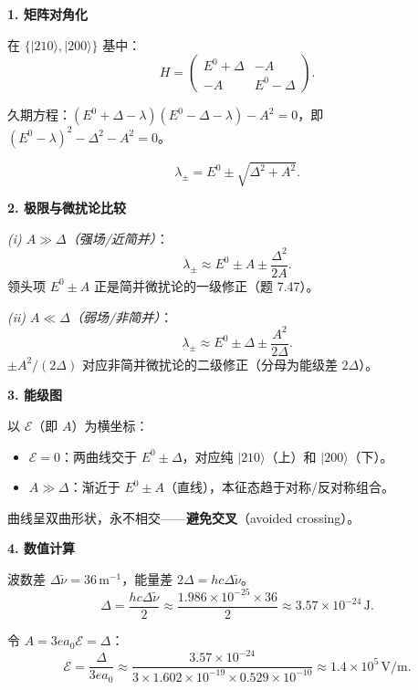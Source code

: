 \begin{derivationbox}[标准解题过程]
\textbf{1. 矩阵对角化}

在 $\{|210\rangle,|200\rangle\}$ 基中：
\[
H=\begin{pmatrix}E^0+\Delta&-A\\-A&E^0-\Delta\end{pmatrix}.
\]

久期方程：$(E^0+\Delta-\lambda)(E^0-\Delta-\lambda)-A^2=0$，即 $(E^0-\lambda)^2-\Delta^2-A^2=0$。

\begin{equation}
\boxed{\lambda_\pm=E^0\pm\sqrt{\Delta^2+A^2}.}
\end{equation}

\textbf{2. 极限与微扰论比较}

\textit{(i) $A\gg\Delta$（强场/近简并）}：
\[
\lambda_\pm\approx E^0\pm A\pm\frac{\Delta^2}{2A}.
\]
领头项 $E^0\pm A$ 正是简并微扰论的一级修正（题 7.47）。

\textit{(ii) $A\ll\Delta$（弱场/非简并）}：
\[
\lambda_\pm\approx E^0\pm\Delta\pm\frac{A^2}{2\Delta}.
\]
$\pm A^2/(2\Delta)$ 对应非简并微扰论的二级修正（分母为能级差 $2\Delta$）。

\textbf{3. 能级图}

以 $\mathcal{E}$（即 $A$）为横坐标：
\begin{itemize}
    \item $\mathcal{E}=0$：两曲线交于 $E^0\pm\Delta$，对应纯 $|210\rangle$（上）和 $|200\rangle$（下）。
    \item $A\gg\Delta$：渐近于 $E^0\pm A$（直线），本征态趋于对称/反对称组合。
\end{itemize}
曲线呈双曲形状，永不相交——\textbf{避免交叉}（avoided crossing）。

\textbf{4. 数值计算}

波数差 $\Delta\tilde{\nu}=36\,\text{m}^{-1}$，能量差 $2\Delta=hc\Delta\tilde{\nu}$。
\[
\Delta=\frac{hc\Delta\tilde{\nu}}{2}\approx\frac{1.986\times10^{-25}\times36}{2}\approx3.57\times10^{-24}\,\text{J}.
\]

令 $A=3ea_0\mathcal{E}=\Delta$：
\begin{equation}
\boxed{\mathcal{E}=\frac{\Delta}{3ea_0}\approx\frac{3.57\times10^{-24}}{3\times1.602\times10^{-19}\times0.529\times10^{-10}}\approx1.4\times10^5\,\text{V/m}.}
\end{equation}
\end{derivationbox}

